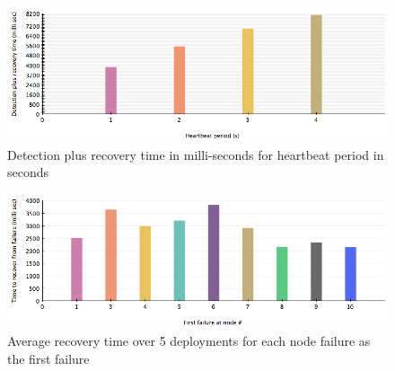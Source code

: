 \begin{figure}[h!]
\centering
    \includegraphics[width=\linewidth]{figures/results-heartbeat-vs-detection-recovery-time}
\caption{Detection plus recovery time in milli-seconds for heartbeat period in seconds}
\label{fig:results-heartbeat-vs-detection-recovery-time}
\end{figure}

\begin{figure}[h!]
\centering
    \includegraphics[width=\linewidth]{figures/results-average-recovery-time-plus-message-overhead}
\caption{Average recovery time over 5 deployments for each node failure as the first failure}
\label{fig:results}
\end{figure}

